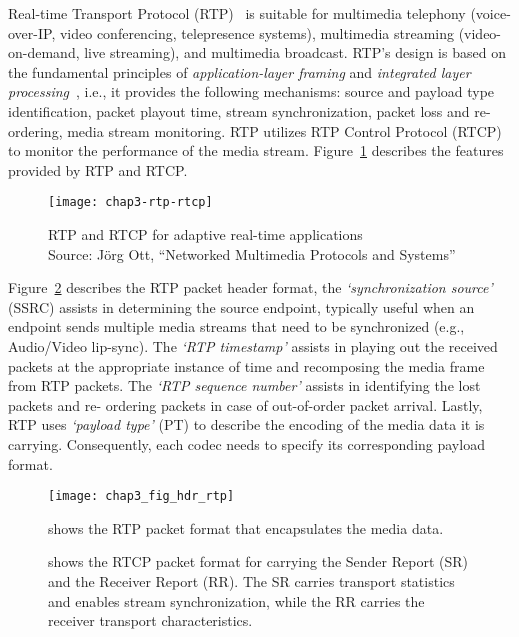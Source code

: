 
Real-time Transport Protocol (RTP)~\cite{rfc3550} is suitable for multimedia
telephony (voice-over-IP, video conferencing, telepresence systems),
multimedia streaming (video-on-demand, live streaming), and multimedia
broadcast. RTP's design is based on the fundamental principles of \textit
{application-layer framing} and \textit{integrated layer
processing}~\cite{clark:alf}, i.e., it provides the following mechanisms:
source and payload type identification, packet playout time, stream
synchronization, packet loss and re-ordering, media stream monitoring. RTP
utilizes RTP Control Protocol (RTCP) to monitor the performance of the media
stream. Figure~\ref{fig:3:rtp:model} describes the features provided by RTP
and RTCP.

\begin{figure}[!h]
\centerline{\texttt{[image: chap3-rtp-rtcp]}}
\caption{RTP and RTCP for adaptive real-time applications\\
{\scriptsize Source: J\"org Ott, ``Networked Multimedia Protocols and Systems''}}
\label{fig:3:rtp:model}
\end{figure}

Figure~\ref{fig:3:rtp.hdr} describes the RTP packet header format, the
\textit{`synchronization source'} (SSRC) assists in determining the source
endpoint, typically useful when an endpoint sends multiple media streams that
need to be synchronized (e.g., Audio/Video lip-sync). The \textit{`RTP
timestamp'} assists in playing out the received packets at the appropriate
instance of time and recomposing the media frame from RTP packets. The
\textit{`RTP sequence number'} assists in identifying the lost packets and re-
ordering packets in case of out-of-order packet arrival. Lastly, RTP uses
\textit{`payload type'} (PT) to describe the encoding of the media data it is
carrying. Consequently, each codec needs to specify its corresponding payload
format.

\begin{figure}[!h]
\centerline{\texttt{[image: chap3\_fig\_hdr\_rtp]}}
\caption{shows the RTP packet format that encapsulates the media data.}
\label{fig:3:rtp.hdr}
\end{figure}

\begin{figure}[!h]
\caption{shows the RTCP packet format for carrying the Sender Report (SR) and
the Receiver Report (RR). The SR carries transport statistics and enables 
stream synchronization, while the RR carries the receiver transport 
characteristics.}
\label{fig:3:rtcp.hdr}
\end{figure}


